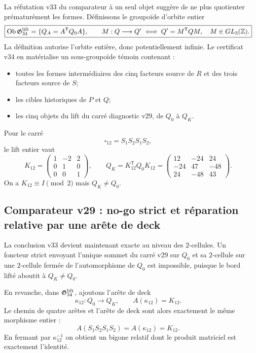 \documentclass[11pt,a4paper]{article}
\begin{document}
La réfutation v33 du comparateur à un seul objet suggère de ne plus quotienter prématurément les
formes. Définissons le groupoïde d'orbite entier
\begin{equation}\label{eq:v34-orbit-groupoid}
 \boxed{
 \operatorname{Ob}\mathfrak G_{34}^{\rm lift}
 =\{Q_A=A^{\mathsf T}Q_0A\},
 \qquad
 M:Q\longrightarrow Q'
 \iff
 Q'=M^{\mathsf T}QM,
 \quad M\in GL_3(\mathbb Z).}
\end{equation}
La définition autorise l'orbite entière, donc potentiellement infinie. Le certificat v34 en
matérialise un sous-groupoïde témoin contenant :
\begin{itemize}
\item toutes les formes intermédiaires des cinq facteurs source de $R$ et des trois facteurs source
de $S$;
\item les cibles historiques de $P$ et $Q$;
\item les cinq objets du lift du carré diagnostic v29, de $Q_0$ à $Q_K$.
\end{itemize}

Pour le carré
\[
 \square_{12}=S_1S_2S_1S_2,
\]
le lift entier vaut
\begin{equation}\label{eq:v34-K12}
 \boxed{
 K_{12}=\begin{pmatrix}1&-2&2\\0&1&0\\0&0&1\end{pmatrix},
 \qquad
 Q_K=K_{12}^{\mathsf T}Q_0K_{12}
 =\begin{pmatrix}
 12&-24&24\\
 -24&47&-48\\
 24&-48&43
 \end{pmatrix}.}
\end{equation}
On a $K_{12}\equiv I\pmod2$ mais $Q_K\neq Q_0$.

\subsection{Comparateur v29 : no-go strict et réparation relative par une arête de deck}

La conclusion v33 devient maintenant exacte au niveau des $2$-cellules.
Un foncteur strict envoyant l'unique sommet du carré v29 sur $Q_0$ et sa $2$-cellule sur une
$2$-cellule fermée de l'automorphisme de $Q_0$ est impossible, puisque le bord lifté aboutit à
$Q_K\neq Q_0$.

En revanche, dans $\mathfrak G_{34}^{\rm lift}$, ajoutons l'arête de deck
\[
 \kappa_{12}:Q_0\longrightarrow Q_K,
 \qquad
 A(\kappa_{12})=K_{12}.
\]
Le chemin de quatre arêtes et l'arête de deck sont alors exactement le même morphisme entier :
\begin{equation}\label{eq:v34-relative-2cell}
 \boxed{
 A(S_1S_2S_1S_2)=A(\kappa_{12})=K_{12}.}
\end{equation}
En fermant par $\kappa_{12}^{-1}$ on obtient un bigone relatif dont le produit matriciel est
exactement l'identité.
\end{document}
